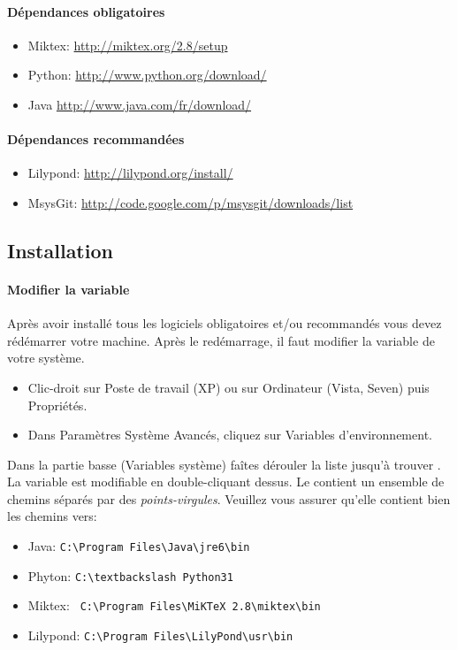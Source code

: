 \documentclass[versionenligne]{framabook}
\begin{document}
\paragraph{Dépendances obligatoires}
\begin{itemize}
 \item Miktex: \url{http://miktex.org/2.8/setup}
 \item Python: \url{http://www.python.org/download/}
 \item Java \url{http://www.java.com/fr/download/}
\end{itemize}

\paragraph{Dépendances recommandées}
\begin{itemize} 
  \item Lilypond: \url{http://lilypond.org/install/}
  \item MsysGit: \url{http://code.google.com/p/msysgit/downloads/list}
\end{itemize}

\subsection{Installation}\label{sec:install-win}

\paragraph{Modifier la variable }
Après avoir installé tous les logiciels obligatoires et/ou recommandés
vous devez rédémarrer votre machine.  Après le redémarrage, il faut
modifier la variable  de votre système.
\begin{itemize}
\item Clic-droit sur Poste de travail (XP) ou sur Ordinateur (Vista, Seven) puis Propriétés. 
\item Dans Paramètres Système Avancés, cliquez sur Variables d'environnement. 
\end{itemize}

Dans la partie basse (Variables système) faîtes dérouler la liste
jusqu'à trouver . La variable est modifiable en
double-cliquant dessus. Le  contient un ensemble de
chemins séparés par des \emph{points-virgules}.  Veuillez vous assurer
qu'elle contient bien les chemins vers:
\begin{itemize}
 \item Java: \verb#C:\Program Files\Java\jre6\bin#
 \item Phyton: \verb#C:\textbackslash Python31#
 \item Miktex: \verb# C:\Program Files\MiKTeX 2.8\miktex\bin#
 \item Lilypond: \verb#C:\Program Files\LilyPond\usr\bin#
\end{itemize}                     
\end{document}
